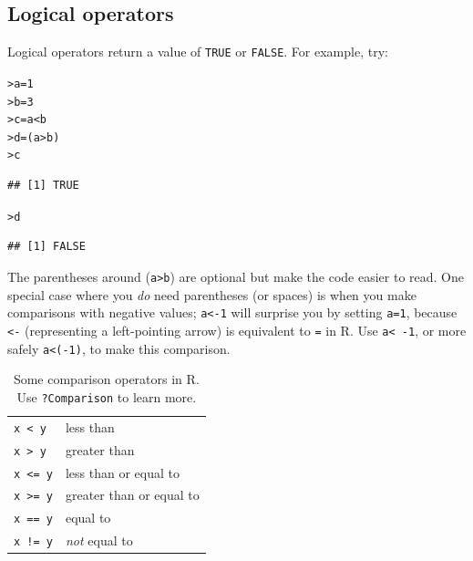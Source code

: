 \documentclass[11pt]{article}\usepackage[]{graphicx}\usepackage[]{color}
\makeatletter
\newcommand{\hlnum}[1]{\textcolor[rgb]{0.686,0.059,0.569}{#1}}%
\newcommand{\hlopt}[1]{\textcolor[rgb]{0,0,0}{#1}}%
\newcommand{\hlstd}[1]{\textcolor[rgb]{0.345,0.345,0.345}{#1}}%
\newcommand{\hlkwb}[1]{\textcolor[rgb]{0.69,0.353,0.396}{#1}}%
\newenvironment{kframe}{%
 \def\at@end@of@kframe{}%
 \ifinner\ifhmode%
  \def\at@end@of@kframe{\end{minipage}}%
  \begin{minipage}{\columnwidth}%
 \fi\fi%
 \def\FrameCommand##1{\hskip\@totalleftmargin \hskip-\fboxsep
 \colorbox{shadecolor}{##1}\hskip-\fboxsep
     \hskip-\linewidth \hskip-\@totalleftmargin \hskip\columnwidth}%
 \MakeFramed {\advance\hsize-\width
   \@totalleftmargin\z@ \linewidth\hsize
   \@setminipage}}%
 {\par\unskip\endMakeFramed%
 \at@end@of@kframe}
\newenvironment{knitrout}{}{} %
\newcommand{\code}[1]{{\tt #1}}
\newcommand\R{{\sf R}}
\numberwithin{exercise}{section}
\makeatother
\begin{document}
\subsection{Logical operators}
Logical operators return a 
value of \code{TRUE} or \code{FALSE}. For example, 
try:  
\begin{knitrout}
\color{fgcolor}\begin{kframe}
\begin{alltt}
\hlstd{> }\hlstd{a} \hlkwb{=} \hlnum{1}
\hlstd{> }\hlstd{b} \hlkwb{=} \hlnum{3}
\hlstd{> }\hlstd{c} \hlkwb{=} \hlstd{a} \hlopt{<} \hlstd{b}
\hlstd{> }\hlstd{d} \hlkwb{=} \hlstd{(a} \hlopt{>} \hlstd{b)}
\hlstd{> }\hlstd{c}
\end{alltt}
\begin{verbatim}
## [1] TRUE
\end{verbatim}
\begin{alltt}
\hlstd{> }\hlstd{d}
\end{alltt}
\begin{verbatim}
## [1] FALSE
\end{verbatim}
\end{kframe}
\end{knitrout}
\noindent The parentheses around (\verb+a>b+) are optional but make
the code easier to read.
One special case where you \emph{do} need parentheses
(or spaces) is when you make comparisons with negative values;
\verb+a<-1+ will surprise you by setting \code{a=1},
because \code{<-} (representing a left-pointing arrow) is
equivalent to \code{=} in \R.  Use 
\verb+a< -1+, or more safely \verb+a<(-1)+,
to make this comparison.

\begin{table}
\begin{tabular}{p{120pt}p{200pt}}
\hline
\code{x < y}  & less than    \\
\code{x > y}  & greater than \\
\code{x <= y} & less than or equal to \\
\code{x >= y} & greater than or equal to \\
\code{x == y} & equal to \\
\code{x != y} & \emph{not} equal to \\
\hline 
\end{tabular}
\caption{Some comparison operators in \R. Use \code{?Comparison} to learn more.}
\label{Comparisons}
\end{table}
\end{document}
